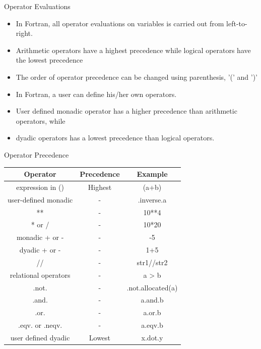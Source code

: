 \documentclass[10pt,t]{beamer}
\begin{document}
\begin{frame}[allowframebreaks]{Operator Evaluations}
  \begin{itemize}
    \item In Fortran, all operator evaluations on variables is carried out from left-to-right.
    \item Arithmetic operators have a highest precedence while logical operators have the lowest precedence
    \item The order of operator precedence can be changed using parenthesis, '(' and ')'
    \item In Fortran, a user can define his/her own operators.
    \item User defined monadic operator has a higher precedence than arithmetic operators, while
    \item dyadic operators has a lowest precedence than logical operators.
  \end{itemize}
  \begin{block}{{\scriptsize Operator Precedence}}
    \begin{center}
      {
      \begin{tabular}{ccc}
        Operator & Precedence & Example \\
        \hline
        expression in () & Highest & (a+b) \\
        user-defined monadic & - & .inverse.a \\
        ** & - & 10**4 \\
        * or / & - & 10*20 \\
        monadic + or - & - & -5 \\
        dyadic + or - & - & 1+5 \\
        // & - & str1//str2 \\
        relational operators & - & a > b \\
        .not. & - & .not.allocated(a) \\
        .and. & - & a.and.b \\
        .or. & - & a.or.b \\
        .eqv. or .neqv. & - & a.eqv.b \\
        user defined dyadic & Lowest & x.dot.y\\
        \hline
      \end{tabular}
      }
    \end{center}
  \end{block}
\end{frame}
\end{document}
